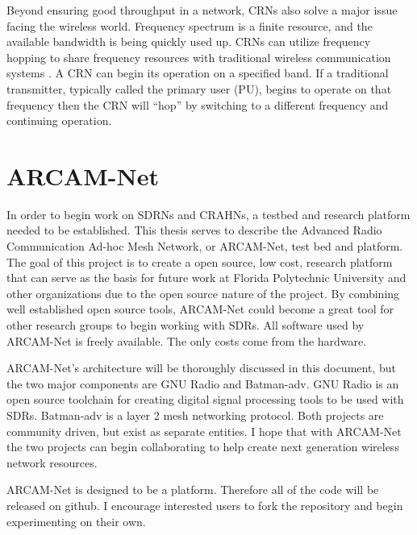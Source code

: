 Beyond ensuring good throughput in a network, CRNs also solve a major issue facing the wireless world. Frequency spectrum is a finite resource, and the available bandwidth is being quickly used up. CRNs can utilize frequency hopping to share frequency resources with traditional wireless communication systems  \cite{6892537}. A CRN can begin its operation on a specified band. If a traditional transmitter, typically called the primary user (PU), begins to operate on that frequency then the CRN will ``hop'' by switching to a different frequency and continuing operation. 


\section{ARCAM-Net}

In order to begin work on SDRNs and CRAHNs, a testbed and research platform needed to be established. This thesis serves to describe the Advanced Radio Communication Ad-hoc Mesh Network, or ARCAM-Net, test bed and platform. The goal of this project is to create a open source, low cost, research platform that can serve as the basis for future work at Florida Polytechnic University and other organizations due to the open source nature of the project. By combining well established open source tools, ARCAM-Net could become a great tool for other research groups to begin working with SDRs. All software used by ARCAM-Net is freely available. The only costs come from the hardware. 

ARCAM-Net's architecture will be thoroughly discussed in this document, but the two major components are GNU Radio and Batman-adv. GNU Radio is an open source toolchain for creating digital signal processing tools to be used with SDRs. Batman-adv is a layer 2 mesh networking protocol. Both projects are community driven, but exist as separate entities. I hope that with ARCAM-Net the two projects can begin collaborating to help create next generation wireless network resources. 

ARCAM-Net is designed to be a platform. Therefore all of the code will be released on github. I encourage interested users to fork the repository and begin experimenting on their own. 

